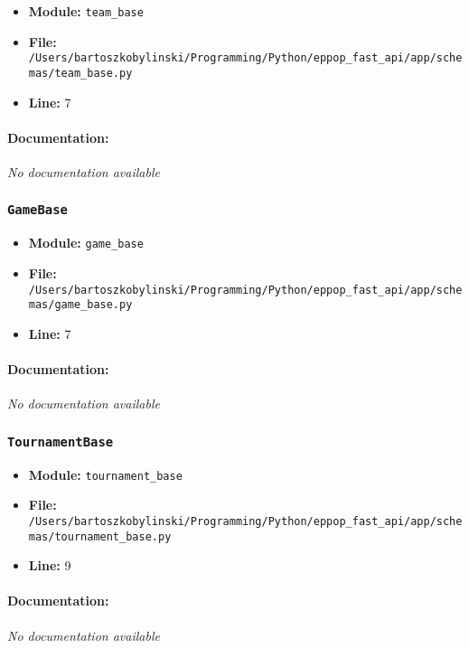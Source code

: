 \documentclass[11pt,a4paper]{article}
\begin{document}
\begin{itemize}
    \item \textbf{Module:} \texttt{team\_base}
    \item \textbf{File:} \texttt{/Users/bartoszkobylinski/Programming/Python/eppop\_fast\_api/app/schemas/team\_base.py}
    \item \textbf{Line:} 7
\end{itemize}

\paragraph{Documentation:} \textit{No documentation available}


\vspace{1em}
\subsubsection{\texttt{GameBase}}

\begin{itemize}
    \item \textbf{Module:} \texttt{game\_base}
    \item \textbf{File:} \texttt{/Users/bartoszkobylinski/Programming/Python/eppop\_fast\_api/app/schemas/game\_base.py}
    \item \textbf{Line:} 7
\end{itemize}

\paragraph{Documentation:} \textit{No documentation available}


\vspace{1em}
\subsubsection{\texttt{TournamentBase}}

\begin{itemize}
    \item \textbf{Module:} \texttt{tournament\_base}
    \item \textbf{File:} \texttt{/Users/bartoszkobylinski/Programming/Python/eppop\_fast\_api/app/schemas/tournament\_base.py}
    \item \textbf{Line:} 9
\end{itemize}

\paragraph{Documentation:} \textit{No documentation available}
\end{document}
